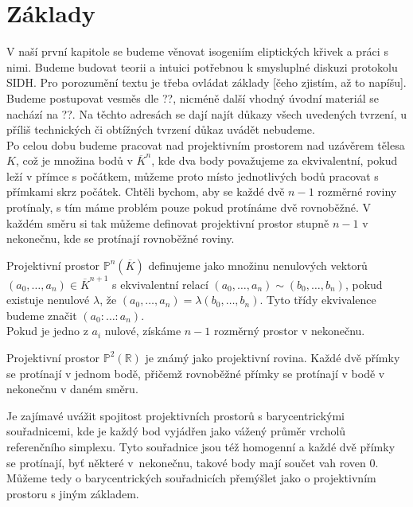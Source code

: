 \documentclass [12pt]{report}
\begin{document}
\section{Základy}

V naší první kapitole se budeme věnovat isogeniím eliptických křivek a práci s nimi. Budeme budovat teorii a intuici potřebnou k smysluplné diskuzi protokolu SIDH. Pro porozumění textu je třeba ovládat základy [čeho zjistím, až to napíšu]. Budeme postupovat vesměs dle ??, nicméně další vhodný úvodní materiál se nachází na ??. Na těchto adresách se dají najít důkazy všech uvedených tvrzení, u příliš technických či obtížných tvrzení důkaz uvádět nebudeme. \\

Po celou dobu budeme pracovat nad projektivním prostorem nad uzávěrem tělesa $K$, což je množina bodů v $\overline{K}^n$, kde dva body považujeme za ekvivalentní, pokud leží v přímce s počátkem, můžeme proto místo jednotlivých bodů pracovat s přímkami skrz počátek. Chtěli bychom, aby se každé dvě $n-1$ rozměrné roviny protínaly, s tím máme problém pouze pokud protínáme dvě rovnoběžné. V každém směru si tak můžeme definovat projektivní prostor stupně $n-1$ v nekonečnu, kde se protínají rovnoběžné roviny.

\begin{definice}
Projektivní prostor $\mathbb{P}^n (\overline{K})$ definujeme jako množinu nenulových vektorů $(a_0, \dots, a_n) \in \overline{K}^{n+1}$ s ekvivalentní relací $(a_0, \dots, a_n) \sim (b_0, \dots, b_n)$, pokud existuje nenulové $\lambda$, že $(a_0, \dots, a_n) = \lambda (b_0, \dots, b_n)$. Tyto třídy ekvivalence budeme značit $(a_0 : \dots : a_n)$.\\

Pokud je jedno z $a_i$ nulové, získáme $n-1$ rozměrný prostor v nekonečnu.
\end{definice}

Projektivní prostor $\mathbb{P}^2 (\mathbb{R})$ je známý jako projektivní rovina. Každé dvě přímky se protínají v jednom bodě, přičemž rovnoběžné přímky se protínají v bodě v nekonečnu v daném směru.

\begin{poznamka}
Je zajímavé uvážit spojitost projektivních prostorů s barycentrickými souřadnicemi, kde je každý bod vyjádřen jako vážený průměr vrcholů referenčního simplexu. Tyto souřadnice jsou též homogenní a každé dvě přímky se protínají, byť některé v~nekonečnu, takové body mají součet vah roven $0$. Můžeme tedy o barycentrických souřadnicích přemýšlet jako o projektivním prostoru s jiným základem.
\end{poznamka}
\end{document}
